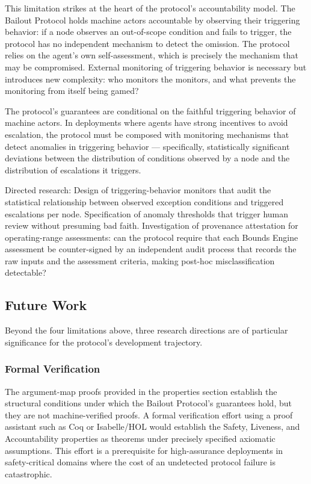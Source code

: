 This limitation strikes at the heart of the protocol's accountability model. The Bailout Protocol holds machine actors accountable by observing their triggering behavior: if a node observes an out-of-scope condition and fails to trigger, the protocol has no independent mechanism to detect the omission. The protocol relies on the agent's own self-assessment, which is precisely the mechanism that may be compromised. External monitoring of triggering behavior is necessary but introduces new complexity: who monitors the monitors, and what prevents the monitoring from itself being gamed?

The protocol's guarantees are conditional on the faithful triggering behavior of machine actors. In deployments where agents have strong incentives to avoid escalation, the protocol must be composed with monitoring mechanisms that detect anomalies in triggering behavior --- specifically, statistically significant deviations between the distribution of conditions observed by a node and the distribution of escalations it triggers.

Directed research: Design of triggering-behavior monitors that audit the statistical relationship between observed exception conditions and triggered escalations per node. Specification of anomaly thresholds that trigger human review without presuming bad faith. Investigation of provenance attestation for operating-range assessments: can the protocol require that each Bounds Engine assessment be counter-signed by an independent audit process that records the raw inputs and the assessment criteria, making post-hoc misclassification detectable?

\subsection{Future Work}

Beyond the four limitations above, three research directions are of particular significance for the protocol's development trajectory.

\subsubsection{Formal Verification}

The argument-map proofs provided in the properties section establish the structural conditions under which the Bailout Protocol's guarantees hold, but they are not machine-verified proofs. A formal verification effort using a proof assistant such as Coq or Isabelle/HOL would establish the Safety, Liveness, and Accountability properties as theorems under precisely specified axiomatic assumptions. This effort is a prerequisite for high-assurance deployments in safety-critical domains where the cost of an undetected protocol failure is catastrophic.

